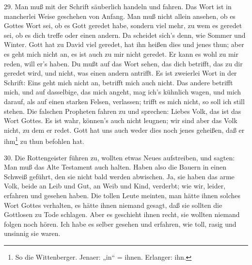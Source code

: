 29. Man muß mit der Schrift säuberlich handeln und fahren. Das Wort ist in mancherlei Weise geschehen von Anfang. Man muß nicht allein ansehen, ob es Gottes Wort sei, ob es Gott geredet habe, sondern viel mehr, zu wem es geredet sei, ob es dich treffe oder einen andern. Da scheidet sich’s denn, wie Sommer und Winter. Gott hat zu David viel geredet, hat ihn heißen dies und jenes thun; aber es geht mich nicht an, es ist auch zu mir nicht geredet. Er kann es wohl zu mir reden, will er’s haben. Du mußt auf das Wort sehen, das dich betrifft, das zu dir geredet wird, und nicht, was einen andern antrifft. Es ist zweierlei Wort in der Schrift: Eins geht mich nicht an, betrifft mich auch nicht. Das andere betrifft mich, und auf dasselbige, das mich angeht, mag ich’s kühnlich wagen, und mich darauf, als auf einen starken Felsen, verlassen; trifft es mich nicht, so soll ich still stehen. Die falschen Propheten fahren zu und sprechen: Liebes Volk, das ist das Wort Gottes. Es ist wahr, können’s auch nicht leugnen; wir sind aber das Volk nicht, zu dem er redet. Gott hat uns auch weder dies noch jenes geheißen, daß er ihm\footnote{So die Wittenberger. Jenaer: „in“ = ihnen. Erlanger: ihn.} zu thun befohlen hat.

30. Die Rottengeister führen zu, wollten etwas Neues aufstreiben, und sagten: Man muß das Alte Testament auch halten. Haben also die Bauern in einen Schweiß geführt, den sie nicht bald werden abwischen. Ja, sie haben das arme Volk, beide an Leib und Gut, an Weib und Kind, verderbt; wie wir, leider, erfahren und gesehen haben. Die tollen Leute meinten, man hätte ihnen solches Wort Gottes verhalten, es hätte ihnen niemand gesagt, daß sie sollten die Gottlosen zu Tode schlagen. Aber es geschieht ihnen recht, sie wollten niemand folgen noch hören. Ich habe es selber gesehen und erfahren, wie toll, rasig und unsinnig sie waren.

